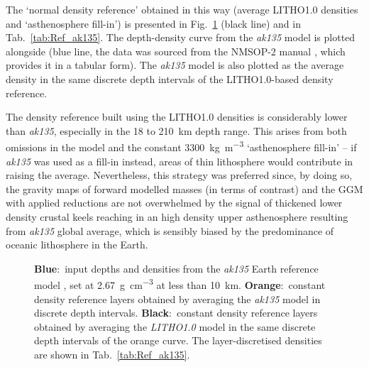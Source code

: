 The `normal density reference' obtained in this way (average {LITHO1.0} densities and `asthenosphere fill-in') is presented in Fig.~\ref{fig:SigIs:Ref_ak135} (black line) and in Tab.~\ref{tab:Ref_ak135}.
The depth-density curve from the \textit{ak135} model \parencites{Kennett1995_ak135}{Montagner1996} is plotted alongside (blue line, the data was sourced from the {NMSOP-2} manual \cite{Bormann2002}, which provides it in a tabular form).
The \textit{ak135} model is also plotted as the average density in the same discrete depth intervals of the LITHO1.0-based density reference.

The density reference built using the {LITHO1.0} densities is considerably lower than \textit{ak135}, especially in the \num{18} to \SI{210}{\kilo \metre} depth range.
This arises from both omissions in the model and the constant \SI{3300}{\kilo \gram \per \cubic \metre} `asthenosphere fill-in' -- if \textit{ak135} was used as a fill-in instead, areas of thin lithosphere would contribute in raising the average.
Nevertheless, this strategy was preferred since, by doing so, the gravity maps of forward modelled masses (in terms of contrast) and the GGM with applied reductions are not overwhelmed by the signal of thickened lower density crustal keels reaching in an high density upper asthenosphere resulting from \textit{ak135} global average, which is sensibly biased by the predominance of oceanic lithosphere in the Earth. 

\begin{figure}
    \begin{adjustbox}{center}
    \end{adjustbox}
    \caption[Depths and densities from the \textit{ak135} reference model, original,layer-discretised and computed on {LITHO1.0} data.]{
        \textbf{Blue}:~input depths and densities from the \textit{ak135} Earth reference model \parencite{Kennett1995_ak135}, set at \SI{2.67}{\gram \per \cubic \centi \metre} at less than \SI{10}{\kilo \metre}.
        \textbf{Orange}:~constant density reference layers obtained by averaging the \textit{ak135} model in discrete depth intervals.
        \textbf{Black}:~constant density reference layers obtained by averaging the \textit{LITHO1.0} \parencite{Pasyanos2014} model in the same discrete depth intervals of the orange curve.
        The layer-discretised densities are shown in Tab.~\ref{tab:Ref_ak135}.}
    \label{fig:SigIs:Ref_ak135}
\end{figure}

